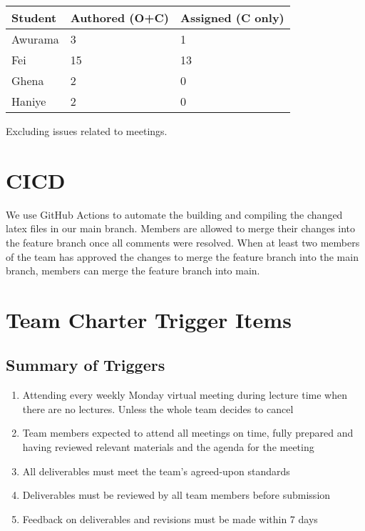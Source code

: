 \documentclass{article}
\begin{document}
\begin{table}[H]
\centering
\begin{tabular}{lll}
\toprule
\textbf{Student} & \textbf{Authored (O+C)} & \textbf{Assigned (C only)}\\
\midrule
Awurama & 3 & 1 \\
Fei & 15 & 13 \\
Ghena & 2 & 0 \\
Haniye & 2 & 0 \\
\bottomrule
\end{tabular}
\end{table}

Excluding issues related to meetings.
\section{CICD}
We use GitHub Actions to automate the building and compiling the changed latex files in our main branch.
Members are allowed to merge their changes into the feature branch once all comments were resolved.
When at least two members of the team has approved the changes to merge the feature branch into the main branch, members can merge the feature branch into main. \\


\section{Team Charter Trigger Items}

\subsection{Summary of Triggers}
\begin{enumerate}
\item{Attending every weekly Monday virtual meeting during lecture time when there are no lectures. Unless the whole team decides to cancel}
\item{Team members expected to attend all meetings on time, fully prepared and having reviewed relevant materials and the agenda for the meeting}
\item{All deliverables must meet the team's agreed-upon standards}
\item{Deliverables must be reviewed by all team members before submission}
\item{Feedback on deliverables and revisions must be made within 7 days}
\end{enumerate}
\end{document}
